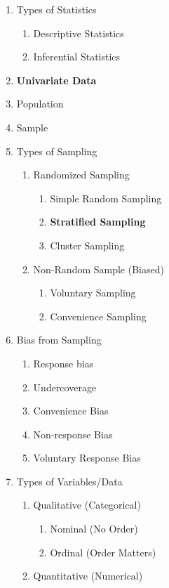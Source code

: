 \documentclass[11pt]{article}
\begin{document}
	\begin{enumerate}
	\item Types of Statistics
		\begin{enumerate}
		\item Descriptive Statistics
		\item Inferential Statistics
		\end{enumerate}
		\item \textbf{Univariate Data}
		\item Population
		\item Sample
		\item Types of Sampling
		\begin{enumerate}
			\item Randomized Sampling
			\begin{enumerate}
				\item Simple Random Sampling
				\item \textbf{Stratified Sampling}
				\item Cluster Sampling
			\end{enumerate}
			\item Non-Random Sample (Biased)
			\begin{enumerate}
				\item Voluntary Sampling
				\item Convenience Sampling
			\end{enumerate}
		\end{enumerate}
		\item Bias from Sampling
		\begin{enumerate}
			\item Response bias
			\item Undercoverage
			\item Convenience Bias
			\item  Non-response Bias
			\item Voluntary Response Bias
		\end{enumerate}
		\item Types of Variables/Data
		\begin{enumerate}
			\item Qualitative (Categorical)
			\begin{enumerate}
				\item Nominal (No Order)
				\item Ordinal (Order Matters)
			\end{enumerate}
			\item Quantitative (Numerical)
			\begin{enumerate}

\end{enumerate}
\end{enumerate}
\end{enumerate}
\end{document}
